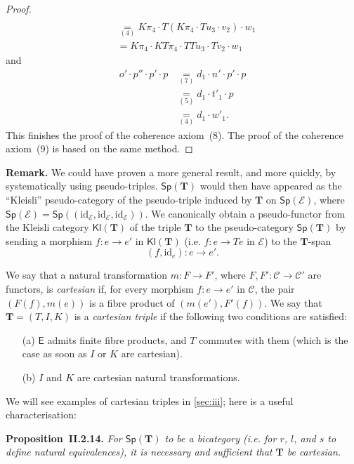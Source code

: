 \documentclass[fleqn]{article}
\newenvironment{itenv}[1]
  {\phantomsection\par\medskip\noindent\textbf{#1.}\itshape}
  {\par\medskip}
\newenvironment{rmenv}[1]
  {\phantomsection\par\medskip\noindent\textbf{#1.}\rmfamily}
  {\par\medskip}
\newcommand{\id}{\mathrm{id}}
\newcommand{\TT}{\mathbf{T}}
\newcommand{\cat}[1]{\mathcal{#1}}
\newcommand{\Cat}[1]{\mathsf{#1}}
\newcommand{\Kl}[1]{\Cat{Kl}(#1)}
\newcommand{\Sp}[1]{\Cat{Sp}(#1)}
\begin{document}
\begin{proof}
\[\begin{aligned}
    \\&\underset{(4)}{=} K\pi_4\cdot T(K\pi_4\cdot Tu_3\cdot v_2)\cdot w_1
    \\&= K\pi_4\cdot KT\pi_4\cdot TTu_3\cdot Tv_2\cdot w_1
    \end{aligned}
  \]
  and
  \[
    \begin{aligned}
      o'\cdot p''\cdot p'\cdot p
      &\underset{(7)}{=} d_1\cdot n'\cdot p'\cdot p
    \\&\underset{(5)}{=} d_1\cdot t'_1\cdot p
    \\&\underset{(4)}{=} d_1\cdot w'_1.
    \end{aligned}
  \]
  This finishes the proof of the coherence axiom~(8).
  The proof of the coherence axiom~(9) is based on the same method.
\end{proof}

\begin{rmenv}{Remark}
  We could have proven a more general result, and more quickly, by systematically using pseudo-triples.
  $\Sp{\TT}$ would then have appeared as the ``Kleisli'' pseudo-category of the pseudo-triple induced by $\TT$ on $\Sp{\cat{E}}$, where $\Sp{\cat{E}}=\Sp{(\id_\cat{E},\id_\cat{E},\id_\cat{E})}$.
  We canonically obtain a pseudo-functor from the Kleisli category $\Kl{\TT}$ of the triple $\TT$ to the pseudo-category $\Sp{\TT}$ by sending a morphism $f\colon e\to e'$ in $\Kl{\TT}$ (i.e. $f\colon e\to Te$ in $\cat{E}$) to the $\TT$-span
  \[
    (f,\id_e)\colon e\to e'.
  \]
\end{rmenv}

We say that a natural transformation $m\colon F\to F'$, where $F,F'\colon\cat{C}\to\cat{C}'$ are functors, is \emph{cartesian} if, for every morphism $f\colon e\to e'$ in $\cat{C}$, the pair $(F(f),m(e))$ is a fibre product of $(m(e'),F'(f))$.
We say that $\TT=(T,I,K)$ is a \emph{cartesian triple} if the following two conditions are satisfied:
\begin{enumerate}
  \item[(a)]
    $\Cat{E}$ admits finite fibre products, and $T$ commutes with them (which is the case as soon as $I$ or $K$ are cartesian).

  \item[(b)]
    $I$ and $K$ are cartesian natural transformations.
\end{enumerate}

We will see examples of cartesian triples in \cref{sec:iii};
here is a useful characterisation:

\begin{itenv}{Proposition~II.2.14}
  For $\Sp{\TT}$ to be a bicategory (i.e. for $r$, $l$, and $s$ to define natural equivalences), it is necessary and sufficient that $\TT$ be cartesian.
\end{itenv}
\end{document}
